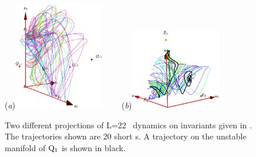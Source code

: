 \begin{figure}[t]
\begin{center}
  (\textit{a})\includegraphics[width=0.35\textwidth]{../figs/ksSO2inv134.eps}
~~~~(\textit{b})\includegraphics[width=0.35\textwidth]{../figs/ksSO2inv145.eps}
\end{center}
\caption[KSe SO(2) reduced phase space with second set of modified invariants.]{ Two different projections
of L=22 \KS\ dynamics on invariants given in . The trajectories shown are 20 short \rpo s. A trajectory on the unstable manifold of $\mathrm{Q}_{1}$ is shown in black.}
\label{fig:SO2inv}
\end{figure}

 

